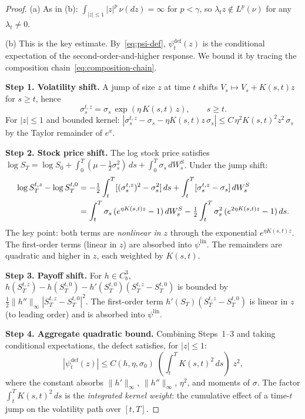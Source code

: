 \documentclass[11pt,a4paper]{article}
\theoremstyle{plain}
\theoremstyle{definition}
\theoremstyle{remark}
\begin{document}
\begin{proof}
(a) As in (b):
$\int_{|z|\leq 1}|z|^p\,\nu(dz) = \infty$ for $p < \gamma$,
so $\lambda_t z \notin L^p(\nu)$ for any $\lambda_t \neq 0$.

(b) This is the key estimate.  By~\eqref{eq:psi-def},
$\psi_t^{\mathrm{def}}(z)$ is the conditional expectation of
the second-order-and-higher response.  We bound it by tracing
the composition chain~\eqref{eq:composition-chain}.

\textbf{Step 1.  Volatility shift.}  A jump of size $z$ at
time $t$ shifts $V_s \mapsto V_s + K(s,t)z$ for $s \geq t$,
hence
\begin{equation}\label{eq:sigma-shift}
  \sigma_s^{t,z} = \sigma_s\,\exp(\eta\,K(s,t)\,z),
  \qquad s \geq t.
\end{equation}
For $|z| \leq 1$ and bounded kernel: $|\sigma_s^{t,z}
- \sigma_s - \eta K(s,t)z\,\sigma_s|
\leq C\,\eta^2 K(s,t)^2 z^2\,\sigma_s$ by the Taylor
remainder of $e^x$.

\textbf{Step 2.  Stock price shift.}  The log stock price
satisfies $\log S_T = \log S_0 + \int_0^T(\mu - \frac{1}{2}
\sigma_s^2)\,ds + \int_0^T \sigma_s\,dW_s^S$.
Under the jump shift:
\begin{align}
  \log S_T^{t,z} - \log S_T^{t,0}
  &= -\tfrac{1}{2}\int_t^T
  [(\sigma_s^{t,z})^2 - \sigma_s^2]\,ds
  + \int_t^T [\sigma_s^{t,z} - \sigma_s]\,dW_s^S
  \notag\\
  &= \int_t^T \sigma_s\,(e^{\eta K(s,t)z} - 1)\,dW_s^S
  - \tfrac{1}{2}\int_t^T \sigma_s^2\,
  (e^{2\eta K(s,t)z} - 1)\,ds.
  \label{eq:logS-shift}
\end{align}
The key point: both terms are \emph{nonlinear in $z$} through
the exponential $e^{\eta K(s,t)z}$.  The first-order terms
(linear in $z$) are absorbed into $\psi^{\mathrm{lin}}$.  The
remainders are quadratic and higher in $z$, each weighted by
$K(s,t)$.

\textbf{Step 3.  Payoff shift.}  For $h \in C_b^3$,
$h(S_T^{t,z}) - h(S_T^{t,0}) - h'(S_T^{t,0})(S_T^{t,z}
- S_T^{t,0})$ is bounded by
$\frac{1}{2}\|h''\|_\infty|S_T^{t,z} - S_T^{t,0}|^2$.
The first-order term $h'(S_T)(S_T^{t,z} - S_T^{t,0})$ is
linear in $z$ (to leading order) and is absorbed into
$\psi^{\mathrm{lin}}$.

\textbf{Step 4.  Aggregate quadratic bound.}  Combining
Steps~1--3 and taking conditional expectations, the defect
satisfies, for $|z| \leq 1$:
\begin{equation}\label{eq:psi-def-bound}
  |\psi_t^{\mathrm{def}}(z)|
  \leq C(h,\eta,\sigma_0)\;\left(\int_t^T K(s,t)^2\,ds\right)
  \;z^2,
\end{equation}
where the constant absorbs $\|h'\|_\infty$, $\|h''\|_\infty$,
$\eta^2$, and moments of $\sigma$.  The factor
$\int_t^T K(s,t)^2\,ds$ is the \emph{integrated kernel weight}:
the cumulative effect of a time-$t$ jump on the volatility
path over $[t,T]$.


\end{proof}
\end{document}
